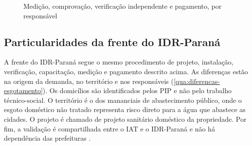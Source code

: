 \begin{figure}[htbp]
  \centering
  \caption{Medição, comprovação, verificação independente e pagamento, por responsável}
  \label{fig:esgotamento-medicao}
\end{figure}


\subsection{Particularidades da frente do IDR-Paraná}
\label{subsec:esgotamento-idr}

A frente do IDR-Paraná segue o mesmo procedimento de projeto, instalação,
verificação, capacitação, medição e pagamento descrito acima. As diferenças
estão na origem da demanda, no território e nos responsáveis
(\autoref{qua:diferencas-esgotamento}). Os domicílios são identificados pelos
PIP e não pelo trabalho técnico-social. O território é o dos mananciais de
abastecimento público, onde o esgoto doméstico não tratado representa risco
direto para a água que abastece as cidades. O projeto é chamado de projeto
sanitário doméstico da propriedade. Por fim, a validação é compartilhada entre
o IAT e o IDR-Paraná e não há dependência das prefeituras \cite{mop2026}.

